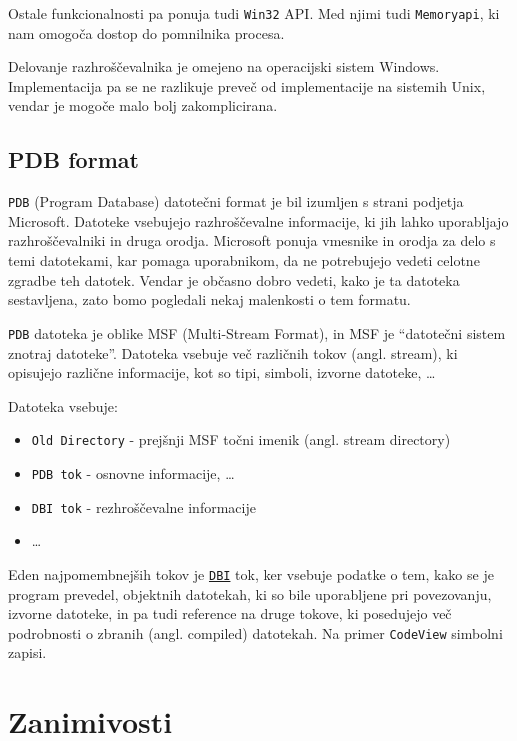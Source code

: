 \documentclass[a4paper,notitlepage]{article}
\newcommand{\code}[1]{\texttt{#1}}
\begin{document}
Ostale funkcionalnosti pa ponuja tudi \code{Win32} API\cite{win32-api}. Med njimi tudi \code{Memoryapi}\cite{win32-memapi}, ki nam omogoča dostop do pomnilnika procesa.

Delovanje razhroščevalnika je omejeno na operacijski sistem Windows. Implementacija pa se ne razlikuje preveč od implementacije na sistemih Unix, vendar je mogoče malo bolj zakomplicirana.

\subsection{PDB format}

\code{PDB}\cite{llvm-pdb} (Program Database) datotečni format je bil izumljen s strani podjetja Microsoft. Datoteke vsebujejo razhroščevalne informacije, ki jih lahko uporabljajo razhroščevalniki in druga orodja.
Microsoft ponuja vmesnike in orodja za delo s temi datotekami, kar pomaga uporabnikom, da ne potrebujejo vedeti celotne zgradbe teh datotek.
Vendar je občasno dobro vedeti, kako je ta datoteka sestavljena, zato bomo pogledali nekaj malenkosti o tem formatu.

\code{PDB} datoteka je oblike MSF (Multi-Stream Format), in MSF je ``datotečni sistem znotraj datoteke''. Datoteka vsebuje več različnih tokov (angl. stream), ki opisujejo različne informacije, kot so tipi, simboli, izvorne datoteke, \ldots

Datoteka vsebuje:
\begin{itemize}
    \item \code{Old Directory} -  prejšnji MSF točni imenik (angl. stream directory)
    \item \code{PDB tok} - osnovne informacije, \ldots
    \item \code{DBI tok} - rezhroščevalne informacije
    \item \ldots
\end{itemize}

Eden najpomembnejših tokov je \href{https://llvm.org/docs/PDB/DbiStream.html}{\code{DBI}} tok, ker vsebuje podatke o tem, kako se je program prevedel, objektnih datotekah, ki so bile uporabljene pri povezovanju, izvorne datoteke, in pa tudi reference na druge tokove, ki posedujejo več podrobnosti o zbranih (angl. compiled) datotekah. Na primer \code{CodeView} simbolni zapisi.

\section{Zanimivosti}
\end{document}
